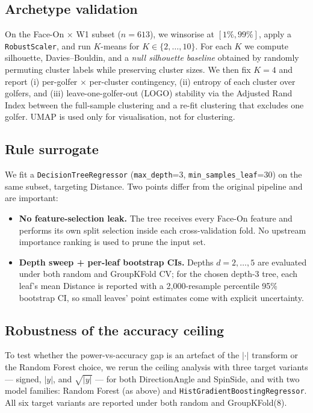 \documentclass[11pt,a4paper]{article}
\begin{document}
\subsection{Archetype validation}
On the Face-On $\times$ W1 subset ($n=613$), we winsorise at $[1\%,99\%]$, apply a \texttt{RobustScaler}, and
run $K$-means for $K\in\{2,\dots,10\}$.  For each $K$ we compute silhouette, Davies--Bouldin, and a \emph{null
silhouette baseline} obtained by randomly permuting cluster labels while preserving cluster sizes.  We then
fix $K=4$ and report (i) per-golfer $\times$ per-cluster contingency, (ii) entropy of each cluster over
golfers, and (iii) leave-one-golfer-out (LOGO) stability via the Adjusted Rand Index between the full-sample
clustering and a re-fit clustering that excludes one golfer.  UMAP \citep{mcinnes2018umap} is used only for
visualisation, not for clustering.

\subsection{Rule surrogate}
We fit a \texttt{DecisionTreeRegressor} (\texttt{max\_depth}=3, \texttt{min\_samples\_leaf}=30) on the same
subset, targeting Distance.  Two points differ from the original pipeline and are important:
\begin{itemize}
    \item \textbf{No feature-selection leak.}  The tree receives every Face-On feature and performs its own
          split selection inside each cross-validation fold.  No upstream importance ranking is used to prune
          the input set.
    \item \textbf{Depth sweep + per-leaf bootstrap CIs.}  Depths $d=2,\dots,5$ are evaluated under both random
          and GroupKFold CV; for the chosen depth-3 tree, each leaf's mean Distance is reported with a 2{,}000-resample
          percentile 95\% bootstrap CI, so small leaves' point estimates come with explicit uncertainty.
\end{itemize}

\subsection{Robustness of the accuracy ceiling}
\label{sec:method-robust}
To test whether the power-vs-accuracy gap is an artefact of the $|\cdot|$ transform or the Random Forest choice,
we rerun the ceiling analysis with three target variants --- signed, $|y|$, and $\sqrt{|y|}$ --- for both
DirectionAngle and SpinSide, and with two model families: Random Forest (as above) and
\texttt{HistGradientBoostingRegressor}.  All six target variants are reported under both random and
GroupKFold(8).
\end{document}
